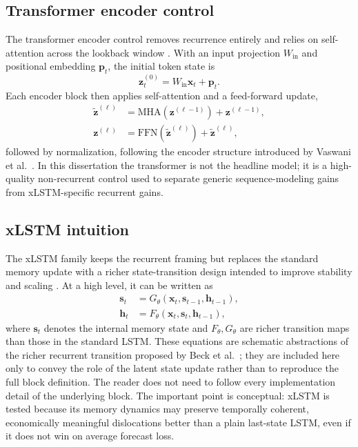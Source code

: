\documentclass[12pt]{report}
\newcommand{\code}[1]{\begingroup\ttfamily\path{#1}\endgroup}
\begin{document}
\subsection{Transformer encoder control}
The transformer encoder control removes recurrence entirely and relies on self-attention across the lookback window \citep{vaswani2017}. With an input projection \(W_{\text{in}}\) and positional embedding \(\mathbf{p}_t\), the initial token state is
\[
\mathbf{z}^{(0)}_t = W_{\text{in}}\mathbf{x}_t + \mathbf{p}_t.
\]
Each encoder block then applies self-attention and a feed-forward update,
\begin{align}
\tilde{\mathbf{z}}^{(\ell)} &= \mathrm{MHA}\!\left(\mathbf{z}^{(\ell-1)}\right) + \mathbf{z}^{(\ell-1)}, \\
\mathbf{z}^{(\ell)} &= \mathrm{FFN}\!\left(\tilde{\mathbf{z}}^{(\ell)}\right) + \tilde{\mathbf{z}}^{(\ell)},
\end{align}
followed by normalization, following the encoder structure introduced by Vaswani et al.~\citep{vaswani2017}. In this dissertation the transformer is not the headline model; it is a high-quality non-recurrent control used to separate generic sequence-modeling gains from xLSTM-specific recurrent gains.

\subsection{xLSTM intuition}
The xLSTM family keeps the recurrent framing but replaces the standard memory update with a richer state-transition design intended to improve stability and scaling \citep{beck2024xlstm}. At a high level, it can be written as
\begin{align}
\mathbf{s}_t &= G_\theta(\mathbf{x}_t, \mathbf{s}_{t-1}, \mathbf{h}_{t-1}), \\
\mathbf{h}_t &= F_\theta(\mathbf{x}_t, \mathbf{s}_t, \mathbf{h}_{t-1}),
\end{align}
where \(\mathbf{s}_t\) denotes the internal memory state and \(F_\theta, G_\theta\) are richer transition maps than those in the standard LSTM. These equations are schematic abstractions of the richer recurrent transition proposed by Beck et al.~\citep{beck2024xlstm}; they are included here only to convey the role of the latent state update rather than to reproduce the full block definition. The reader does not need to follow every implementation detail of the underlying \code{mLSTM} block. The important point is conceptual: xLSTM is tested because its memory dynamics may preserve temporally coherent, economically meaningful dislocations better than a plain last-state LSTM, even if it does not win on average forecast loss.
\end{document}
